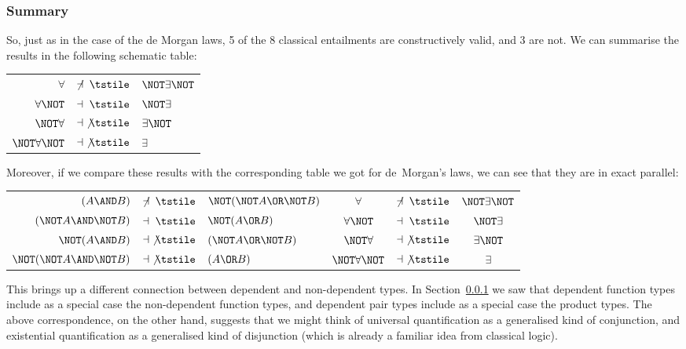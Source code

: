 \subsubsection{Summary}

So, just as in the case of the de Morgan laws, 5 of the 8 classical entailments are constructively valid, and 3 are not.  We can summarise the results in the following schematic table:

\begin{table}[h]
\centering
\begin{tabular}{r c l}
$\forall$					&$\not\dashv \; \tstile$ 	
&$\NOT \exists\NOT $
 \\
$\forall\NOT $					&$\dashv \; \tstile$ 	
&$\NOT \exists$
 \\
$\NOT\forall$					&$\dashv \; \not\tstile$ 	
&$\exists\NOT $
 \\
$\NOT\forall\NOT $					&$\dashv \; \not\tstile$ 	
&$\exists$
\end{tabular}
\end{table}

Moreover, if we compare these results with the corresponding table we got for de~Morgan's laws, we can see that they are in exact parallel:

\begin{table}[h]
\centering
\begin{tabular}{r c l || c c c}
$(A \AND B)$					
&$\not\dashv \; \tstile$ 	
&$\NOT(\NOT A \OR \NOT B)$
%
&$\forall$					
&$\not\dashv \; \tstile$ 	
&$\NOT \exists\NOT $
 \\  %
$(\NOT A \AND \NOT B)$ 	 	
&$\dashv \; \tstile$ 	
&$\NOT(A \OR B)$ 
%
&$\forall\NOT $					
&$\dashv \; \tstile$ 	
&$\NOT \exists$
 \\  %
$\NOT(A \AND B)$  				
&$\dashv \; \not\tstile$ 	
&$(\NOT A \OR \NOT B)$
%
& $\NOT\forall$					
&$\dashv \; \not\tstile$ 	
&$\exists\NOT $
 \\  %
$\NOT (\NOT A \AND \NOT B)$	
&$\dashv \; \not\tstile$ 	
&$(A \OR B)$
%
& $\NOT\forall\NOT $					
&$\dashv \; \not\tstile$ 	
&$\exists$
\end{tabular}
\end{table}

This brings up a different connection between dependent and non-dependent types.  In Section~\ref{} we saw that dependent function types include as a special case the non-dependent function types, and dependent pair types include as a special case the product types.  The above correspondence, on the other hand, suggests that we might think of 
universal quantification as a generalised kind of conjunction, and 
existential quantification as a generalised kind of disjunction (which is already a familiar idea from classical logic).  

